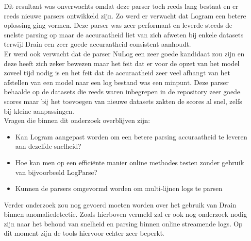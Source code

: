 Dit resultaat was onverwachts omdat deze parser toch reeds lang bestaat en er reeds nieuwe parsers ontwikkeld zijn. Zo werd er verwacht dat Logram een betere oplossing ging vormen. Deze parser was zeer performant en leverde steeds de snelste parsing op maar de accuraatheid liet van zich afweten bij enkele datasets terwijl Drain een zeer goede accuraatheid consistent aanhoudt.\\

Er werd ook verwacht dat de parser NuLog een zeer goede kandidaat zou zijn en deze heeft zich zeker bewezen maar het feit dat er voor de opzet van het model zoveel tijd nodig is en het feit dat de accuraatheid zeer veel afhangt van het afstellen van een model naar een log bestand was een minpunt. Deze parser behaalde op de datasets die reeds waren inbegrepen in de repository zeer goede scores maar bij het toevoegen van nieuwe datasets zakten de scores al snel, zelfs bij kleine aanpassingen.\\

Vragen die binnen dit onderzoek overblijven zijn:
\begin{itemize}
    \item Kan Logram aangepast worden om een betere parsing accuraatheid te leveren aan dezelfde snelheid?
    \item Hoe kan men op een efficiënte manier online methodes testen zonder gebruik van bijvoorbeeld LogParse?
    \item Kunnen de parsers omgevormd worden om multi-lijnen logs te parsen
\end{itemize} 

Verder onderzoek zou nog gevoerd moeten worden over het gebruik van Drain binnen anomaliedetectie. Zoals hierboven vermeld zal er ook nog onderzoek nodig zijn naar het behoud van snelheid en parsing binnen online streamende logs. Op dit moment zijn de tools hiervoor echter zeer beperkt.